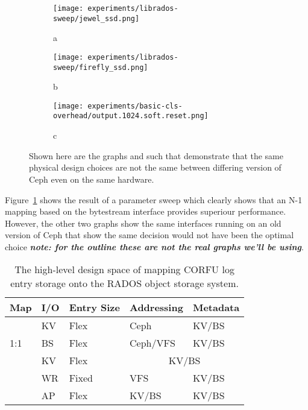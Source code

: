 \documentclass[10pt,twocolumn]{article}
\begin{document}
\begin{figure*}[!ht]
    \centering
    \begin{subfigure}{.6\columnwidth}
        \texttt{[image: experiments/librados-sweep/jewel\_ssd.png]}
        \caption{a}
        \label{fig:vanilla-io-diff}
    \end{subfigure}\hfill
    \begin{subfigure}{.6\columnwidth}
        \texttt{[image: experiments/librados-sweep/firefly\_ssd.png]}
        \caption{b}
    \end{subfigure}\hfill
    \begin{subfigure}{.6\columnwidth}
        \texttt{[image: experiments/basic-cls-overhead/output.1024.soft.reset.png]}
        \caption{c}
    \end{subfigure}\hfill
    \caption{Shown here are the graphs and such that demonstrate that the same
        physical design choices are not the same between differing version of
    Ceph even on the same hardware.}
\end{figure*}

Figure~\ref{fig:vanilla-io-diff} shows the result of a parameter sweep which
clearly shows that an N-1 mapping based on the bytestream interface provides
superiour performance. However, the other two graphs show the same interfaces
running on an old version of Ceph that show the same decision would not have
been the optimal choice {\bf \emph{note: for the outline these are not the
real graphs we'll be using}}.

\begin{table}
\begin{tabular}{ | l | l | l | l | l |}
\hline
Map & I/O & Entry Size & Addressing & Metadata \\ \hline
\multirow{3}{*}{1:1} & KV  & Flex     & Ceph      & KV/BS \\ \cline{2-5}
                     & BS  & Flex     & Ceph/VFS  & KV/BS \\ \hline
\multirow{4}{*}{N:1} & KV  & Flex     & \multicolumn{2}{|c|}{KV/BS} \\ \cline{2-5}
                     & WR  & Fixed    & VFS       & KV/BS \\ \cline{2-5}
                     & AP  & Flex     & KV/BS     & KV/BS \\
\hline
\end{tabular}
\caption{The high-level design space of mapping CORFU log entry storage onto
the RADOS object storage system.}
\label{tab:pd-map}
\end{table}
\end{document}
